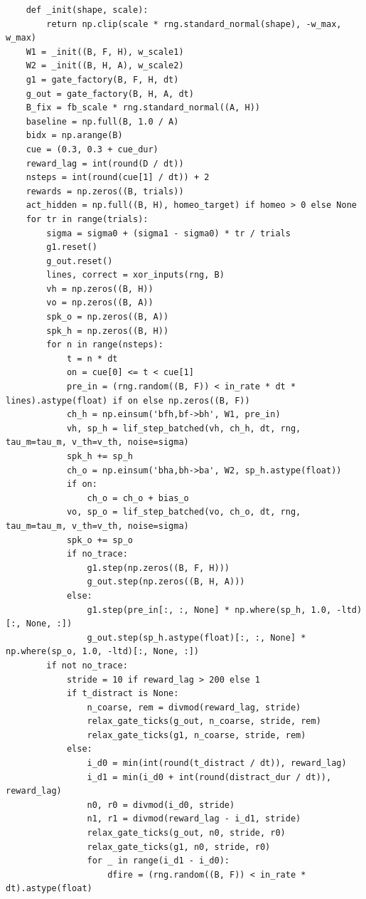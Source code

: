 \documentclass[a4paper,10pt]{article}
\begin{document}
\begin{Verbatim}
    def _init(shape, scale):
        return np.clip(scale * rng.standard_normal(shape), -w_max, w_max)
    W1 = _init((B, F, H), w_scale1)
    W2 = _init((B, H, A), w_scale2)
    g1 = gate_factory(B, F, H, dt)
    g_out = gate_factory(B, H, A, dt)
    B_fix = fb_scale * rng.standard_normal((A, H))
    baseline = np.full(B, 1.0 / A)
    bidx = np.arange(B)
    cue = (0.3, 0.3 + cue_dur)
    reward_lag = int(round(D / dt))
    nsteps = int(round(cue[1] / dt)) + 2
    rewards = np.zeros((B, trials))
    act_hidden = np.full((B, H), homeo_target) if homeo > 0 else None
    for tr in range(trials):
        sigma = sigma0 + (sigma1 - sigma0) * tr / trials
        g1.reset()
        g_out.reset()
        lines, correct = xor_inputs(rng, B)
        vh = np.zeros((B, H))
        vo = np.zeros((B, A))
        spk_o = np.zeros((B, A))
        spk_h = np.zeros((B, H))
        for n in range(nsteps):
            t = n * dt
            on = cue[0] <= t < cue[1]
            pre_in = (rng.random((B, F)) < in_rate * dt * lines).astype(float) if on else np.zeros((B, F))
            ch_h = np.einsum('bfh,bf->bh', W1, pre_in)
            vh, sp_h = lif_step_batched(vh, ch_h, dt, rng, tau_m=tau_m, v_th=v_th, noise=sigma)
            spk_h += sp_h
            ch_o = np.einsum('bha,bh->ba', W2, sp_h.astype(float))
            if on:
                ch_o = ch_o + bias_o
            vo, sp_o = lif_step_batched(vo, ch_o, dt, rng, tau_m=tau_m, v_th=v_th, noise=sigma)
            spk_o += sp_o
            if no_trace:
                g1.step(np.zeros((B, F, H)))
                g_out.step(np.zeros((B, H, A)))
            else:
                g1.step(pre_in[:, :, None] * np.where(sp_h, 1.0, -ltd)[:, None, :])
                g_out.step(sp_h.astype(float)[:, :, None] * np.where(sp_o, 1.0, -ltd)[:, None, :])
        if not no_trace:
            stride = 10 if reward_lag > 200 else 1
            if t_distract is None:
                n_coarse, rem = divmod(reward_lag, stride)
                relax_gate_ticks(g_out, n_coarse, stride, rem)
                relax_gate_ticks(g1, n_coarse, stride, rem)
            else:
                i_d0 = min(int(round(t_distract / dt)), reward_lag)
                i_d1 = min(i_d0 + int(round(distract_dur / dt)), reward_lag)
                n0, r0 = divmod(i_d0, stride)
                n1, r1 = divmod(reward_lag - i_d1, stride)
                relax_gate_ticks(g_out, n0, stride, r0)
                relax_gate_ticks(g1, n0, stride, r0)
                for _ in range(i_d1 - i_d0):
                    dfire = (rng.random((B, F)) < in_rate * dt).astype(float)

\end{Verbatim}
\end{document}
